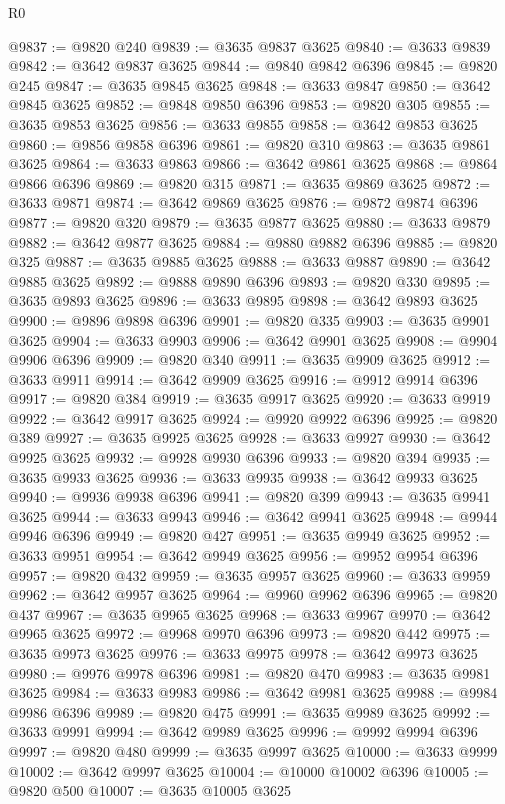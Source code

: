 \begin{lexlean}{R0}
\begin{coremodule}
@9837 := @9820 @240
@9839 := @3635 @9837 @3625
@9840 := @3633 @9839
@9842 := @3642 @9837 @3625
@9844 := @9840 @9842 @6396
@9845 := @9820 @245
@9847 := @3635 @9845 @3625
@9848 := @3633 @9847
@9850 := @3642 @9845 @3625
@9852 := @9848 @9850 @6396
@9853 := @9820 @305
@9855 := @3635 @9853 @3625
@9856 := @3633 @9855
@9858 := @3642 @9853 @3625
@9860 := @9856 @9858 @6396
@9861 := @9820 @310
@9863 := @3635 @9861 @3625
@9864 := @3633 @9863
@9866 := @3642 @9861 @3625
@9868 := @9864 @9866 @6396
@9869 := @9820 @315
@9871 := @3635 @9869 @3625
@9872 := @3633 @9871
@9874 := @3642 @9869 @3625
@9876 := @9872 @9874 @6396
@9877 := @9820 @320
@9879 := @3635 @9877 @3625
@9880 := @3633 @9879
@9882 := @3642 @9877 @3625
@9884 := @9880 @9882 @6396
@9885 := @9820 @325
@9887 := @3635 @9885 @3625
@9888 := @3633 @9887
@9890 := @3642 @9885 @3625
@9892 := @9888 @9890 @6396
@9893 := @9820 @330
@9895 := @3635 @9893 @3625
@9896 := @3633 @9895
@9898 := @3642 @9893 @3625
@9900 := @9896 @9898 @6396
@9901 := @9820 @335
@9903 := @3635 @9901 @3625
@9904 := @3633 @9903
@9906 := @3642 @9901 @3625
@9908 := @9904 @9906 @6396
@9909 := @9820 @340
@9911 := @3635 @9909 @3625
@9912 := @3633 @9911
@9914 := @3642 @9909 @3625
@9916 := @9912 @9914 @6396
@9917 := @9820 @384
@9919 := @3635 @9917 @3625
@9920 := @3633 @9919
@9922 := @3642 @9917 @3625
@9924 := @9920 @9922 @6396
@9925 := @9820 @389
@9927 := @3635 @9925 @3625
@9928 := @3633 @9927
@9930 := @3642 @9925 @3625
@9932 := @9928 @9930 @6396
@9933 := @9820 @394
@9935 := @3635 @9933 @3625
@9936 := @3633 @9935
@9938 := @3642 @9933 @3625
@9940 := @9936 @9938 @6396
@9941 := @9820 @399
@9943 := @3635 @9941 @3625
@9944 := @3633 @9943
@9946 := @3642 @9941 @3625
@9948 := @9944 @9946 @6396
@9949 := @9820 @427
@9951 := @3635 @9949 @3625
@9952 := @3633 @9951
@9954 := @3642 @9949 @3625
@9956 := @9952 @9954 @6396
@9957 := @9820 @432
@9959 := @3635 @9957 @3625
@9960 := @3633 @9959
@9962 := @3642 @9957 @3625
@9964 := @9960 @9962 @6396
@9965 := @9820 @437
@9967 := @3635 @9965 @3625
@9968 := @3633 @9967
@9970 := @3642 @9965 @3625
@9972 := @9968 @9970 @6396
@9973 := @9820 @442
@9975 := @3635 @9973 @3625
@9976 := @3633 @9975
@9978 := @3642 @9973 @3625
@9980 := @9976 @9978 @6396
@9981 := @9820 @470
@9983 := @3635 @9981 @3625
@9984 := @3633 @9983
@9986 := @3642 @9981 @3625
@9988 := @9984 @9986 @6396
@9989 := @9820 @475
@9991 := @3635 @9989 @3625
@9992 := @3633 @9991
@9994 := @3642 @9989 @3625
@9996 := @9992 @9994 @6396
@9997 := @9820 @480
@9999 := @3635 @9997 @3625
@10000 := @3633 @9999
@10002 := @3642 @9997 @3625
@10004 := @10000 @10002 @6396
@10005 := @9820 @500
@10007 := @3635 @10005 @3625

\end{coremodule}
\end{lexlean}
